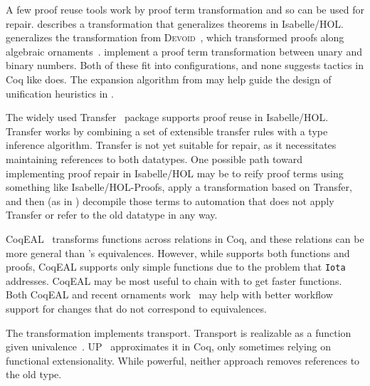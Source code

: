 \vspace{0.281cm}
A few proof reuse tools work by proof term transformation and so can be used for repair.
\citet{Johnsen2004} describes a transformation that generalizes theorems in Isabelle/HOL.
\toolname generalizes the transformation from \textsc{Devoid}~\cite{Ringer2019},
which transformed proofs along algebraic ornaments~\cite{mcbride}.
\citet{magaud2000changing} implement a proof term transformation between
unary and binary numbers. 
Both of these fit into \toolname configurations,
and none suggests tactics in Coq like \toolname does.
The expansion algorithm from \citet{magaud2000changing} may help guide the design
of unification heuristics in \toolname.

The widely used Transfer~\cite{Huffman2013} package supports proof reuse in Isabelle/HOL.
Transfer works by combining a set of extensible transfer rules with a type inference algorithm.
Transfer is not yet suitable for repair, as it necessitates maintaining references to both datatypes.
One possible path toward implementing proof repair in Isabelle/HOL may be to reify proof terms using something like
Isabelle/HOL-Proofs, apply a transformation based on Transfer, and then (as in \toolname) decompile those terms to automation that does not apply Transfer or refer to the old datatype in any way.

CoqEAL~\cite{cohen:hal-01113453} transforms functions across relations in Coq,
and these relations can be more general than \toolname's equivalences.
However, while \toolname supports both functions and proofs, CoqEAL supports only simple functions
due to the problem that \lstinline{Iota} addresses.
CoqEAL may be most useful to chain with \toolname to get faster functions.
Both CoqEAL and recent ornaments work~\cite{williamsphd} may help with
better workflow support for changes that do not correspond to equivalences.

The \toolname transformation implements transport.
Transport is realizable as a function given univalence~\cite{univalent2013homotopy}.
UP~\cite{tabareau2017equivalences} approximates it
in Coq, only sometimes relying on functional extensionality.
While powerful, neither approach removes references to the old type. %

